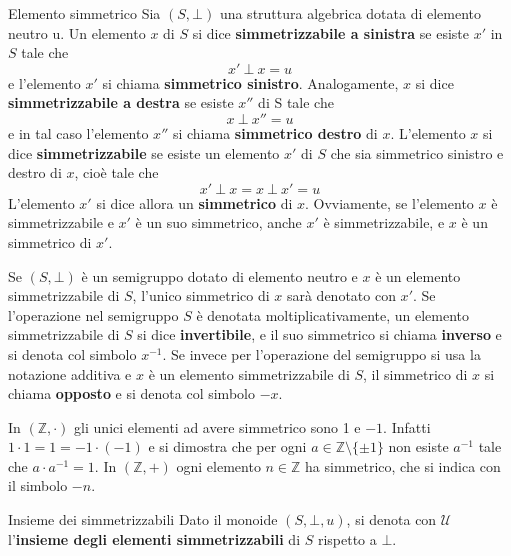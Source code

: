 \begin{defbox}{Elemento simmetrico}
	Sia $(S, \bot)$ una struttura algebrica dotata di elemento neutro u. Un elemento $x$ di $S$ si dice \textbf{simmetrizzabile a sinistra} se esiste $x'$ in $S$ tale che
	\begin{equation}
		x' \ \bot \ x = u
	\end{equation}
	e l'elemento $x'$ si chiama \textbf{simmetrico sinistro}. Analogamente, $x$ si dice \textbf{simmetrizzabile a destra} se esiste $x''$ di S tale che
	\begin{equation}
		x \ \bot \ x'' = u
	\end{equation}
	e in tal caso l'elemento $x''$ si chiama \textbf{simmetrico destro} di $x$.
	L'elemento $x$ si dice \textbf{simmetrizzabile} se esiste un elemento $x'$ di $S$ che sia simmetrico sinistro e destro di $x$, cioè tale che
	\begin{equation}
		x' \ \bot \ x= x \ \bot \ x' = u
	\end{equation}
	L'elemento $x'$ si dice allora un \textbf{simmetrico} di $x$. Ovviamente, se l'elemento $x$ è simmetrizzabile e $x'$ è un suo simmetrico, anche $x'$ è simmetrizzabile, e $x$ è un simmetrico di $x'$.
\end{defbox}

Se $(S, \bot)$ è un semigruppo dotato di elemento neutro e $x$ è un elemento simmetrizzabile di $S$, l'unico simmetrico di $x$ sarà denotato con $x'$. Se l'operazione nel semigruppo $S$ è denotata moltiplicativamente, un elemento simmetrizzabile di $S$ si dice \textbf{invertibile}, e il suo simmetrico si chiama \textbf{inverso} e si denota col simbolo $x^{-1}$. Se invece per l'operazione del semigruppo si usa la notazione additiva e $x$ è un elemento simmetrizzabile di $S$, il simmetrico di $x$ si chiama \textbf{opposto} e si denota col simbolo $-x$.

\begin{example}
	In $(\mathbb{Z}, \cdot)$ gli unici elementi ad avere simmetrico sono 1 e $-1$. Infatti $1 \cdot 1 = 1 = -1 \cdot (-1)$ e si dimostra che per ogni $a \in \mathbb{Z}\setminus\{\pm 1\}$ non esiste $a^{-1}$ tale che $a \cdot a^{-1} = 1$. In $(\mathbb{Z}, +)$ ogni elemento $n \in \mathbb{Z}$ ha simmetrico, che si indica con il simbolo $-n$.
\end{example}

\begin{defbox}{Insieme dei simmetrizzabili}
	Dato il monoide $(S, \bot, u)$, si denota con $\mathcal{U}$ l'\textbf{insieme degli elementi simmetrizzabili} di $S$ rispetto a $\bot$.
\end{defbox}

